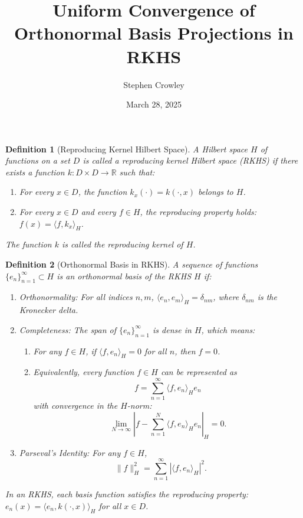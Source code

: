 \documentclass{article}
\newcommand{\cdummy}{\cdot}
\newtheorem{definition}{Definition}
{\theorembodyfont{\rmfamily}\newtheorem{remark}{Remark}}
\begin{document}
\title{Uniform Convergence of Orthonormal Basis Projections in RKHS}

\author{Stephen Crowley}

\date{March 28, 2025}

\maketitle

\begin{definition}
  [Reproducing Kernel Hilbert Space] A Hilbert space $H$ of functions on a set
  $D$ is called a reproducing kernel Hilbert space (RKHS) if there exists a
  function $k : D \times D \to \mathbb{R}$ such that:
  \begin{enumerate}
    \item For every $x \in D$, the function $k_x (\cdummy) = k (\cdummy, x)$
    belongs to $H$.
    
    \item For every $x \in D$ and every $f \in H$, the reproducing property
    holds: $f (x) = \langle f, k_x \rangle_H$.
  \end{enumerate}
  The function $k$ is called the reproducing kernel of $H$.
\end{definition}

\begin{definition}
  [Orthonormal Basis in RKHS]\label{def:orthonormal_basis}A sequence of
  functions $\{e_n \}_{n = 1}^{\infty} \subset H$ is an orthonormal basis of
  the RKHS $H$ if:
  \begin{enumerate}
    \item Orthonormality: For all indices $n, m$, $\langle e_n, e_m \rangle_H
    = \delta_{nm}$, where $\delta_{nm}$ is the Kronecker delta.
    
    \item Completeness: The span of $\{e_n \}_{n = 1}^{\infty}$ is dense in
    $H$, which means:
    \begin{enumerate}
      \item For any $f \in H$, if $\langle f, e_n \rangle_H = 0$ for all $n$,
      then $f = 0$.
      
      \item Equivalently, every function $f \in H$ can be represented as
      \[ f = \sum_{n = 1}^{\infty} \langle f, e_n \rangle_H e_n \]
      with convergence in the $H$-norm:
      \[ \lim_{N \to \infty} \left| f - \sum_{n = 1}^N \langle f, e_n
         \rangle_H e_n \right|_H = 0. \]
    \end{enumerate}
    \item Parseval's Identity: For any $f \in H$,
    \[ \|f\|_H^2 = \sum_{n = 1}^{\infty} | \langle f, e_n \rangle_H |^2 . \]
  \end{enumerate}
  In an RKHS, each basis function satisfies the reproducing property: $e_n (x)
  = \langle e_n, k (\cdot, x) \rangle_H$ for all $x \in D$.
\end{definition}
\end{document}
